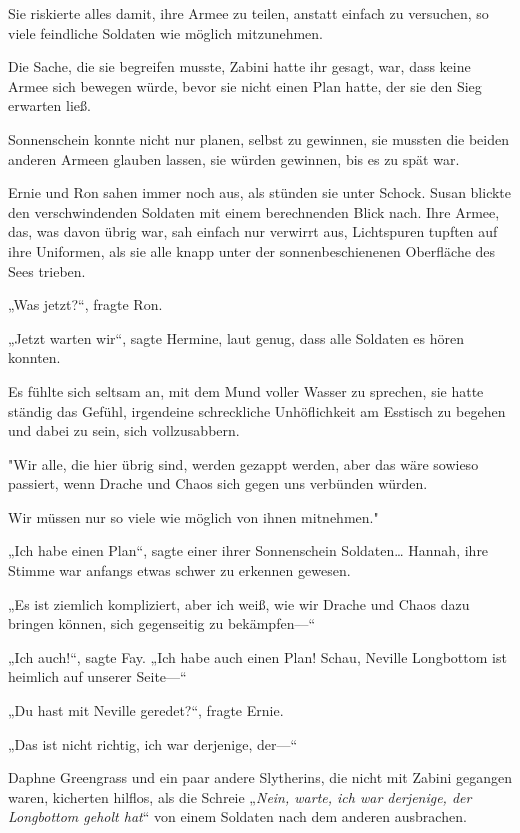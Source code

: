 {Sie riskierte alles damit, ihre Armee zu teilen, anstatt einfach zu versuchen, so viele feindliche Soldaten wie möglich mitzunehmen.

Die Sache, die sie begreifen musste, Zabini hatte ihr gesagt, war, dass keine Armee sich bewegen würde, bevor sie nicht einen Plan hatte, der sie den Sieg erwarten ließ.

Sonnenschein konnte nicht nur planen, selbst zu gewinnen, sie mussten die beiden anderen Armeen glauben lassen, sie würden gewinnen, bis es zu spät war.

Ernie und Ron sahen immer noch aus, als stünden sie unter Schock. Susan blickte den verschwindenden Soldaten mit einem berechnenden Blick nach. Ihre Armee, das, was davon übrig war, sah einfach nur verwirrt aus, Lichtspuren tupften auf ihre Uniformen, als sie alle knapp unter der sonnenbeschienenen Oberfläche des Sees trieben.

„Was jetzt?“, fragte Ron.

„Jetzt warten wir“, sagte Hermine, laut genug, dass alle Soldaten es hören konnten.

Es fühlte sich seltsam an, mit dem Mund voller Wasser zu sprechen, sie hatte ständig das Gefühl, irgendeine schreckliche Unhöflichkeit am Esstisch zu begehen und dabei zu sein, sich vollzusabbern.

"Wir alle, die hier übrig sind, werden gezappt werden, aber das wäre sowieso passiert, wenn Drache und Chaos sich gegen uns verbünden würden.

Wir müssen nur so viele wie möglich von ihnen mitnehmen."

„Ich habe einen Plan“, sagte einer ihrer Sonnenschein Soldaten… Hannah, ihre Stimme war anfangs etwas schwer zu erkennen gewesen.

„Es ist ziemlich kompliziert, aber ich weiß, wie wir Drache und Chaos dazu bringen können, sich gegenseitig zu bekämpfen—“

„Ich auch!“, sagte Fay. „Ich habe auch einen Plan! Schau, Neville Longbottom ist heimlich auf unserer Seite—“

„Du hast mit Neville geredet?“, fragte Ernie.

„Das ist nicht richtig, ich war derjenige, der—“

Daphne Greengrass und ein paar andere Slytherins, die nicht mit Zabini gegangen waren, kicherten hilflos, als die Schreie „\emph{Nein, warte, ich war derjenige, der Longbottom geholt hat}“ von einem Soldaten nach dem anderen ausbrachen.

}
